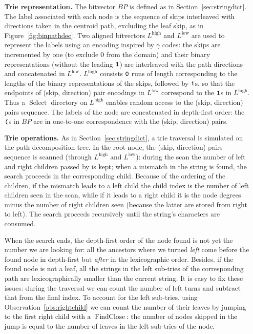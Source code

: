 \documentclass[a4paper,11pt]{article}
\newcommand{\ttlpar}[1]{\noindent\textbf{#1}}
\theoremstyle{nonumberplain}
\DeclareMathOperator{\Select}{Select}
\DeclareMathOperator{\FindClose}{FindClose}
\newcommand{\bit}[1]{\text{\bf\texttt{#1}}}
\newcommand{\bitzero}{\bit{0}}
\newcommand{\bitone}{\bit{1}}
\newcommand{\paropen}{\text{\bf\texttt{(}}}
\newcommand{\Lhigh}{L^\text{high}}
\newcommand{\Llow}{L^\text{low}}
\begin{document}
\ttlpar{Trie representation.} 
The bitvector $BP$ is defined as in Section~\ref{sec:stringdict}. The
label associated with each node is the sequence of skips interleaved
with directions taken in the centroid path, excluding the leaf skip,
as in Figure~\ref{fig:binpathdec}. Two aligned bitvectors $\Lhigh$ and $\Llow$
are used to represent the labels using an encoding inspired by
$\gamma$ codes: the skips are incremented by one (to exclude $0$ from
the domain) and their binary representations (without the leading $\bitone$) are interleaved with the
path directions and concatenated in $\Llow$. $\Lhigh$ consists 
$\bitzero$ runs of length corresponding to the 
lengths of the binary representations of the skips, followed by
$\bitone$s, so that the endpoints of (skip, direction) pair encodings in $\Llow$
correspond to the $\bitone$s in $\Lhigh$. Thus a $\Select$ directory on
$\Lhigh$ enables random access to the (skip, direction) pairs
sequence. The labels of the node are concatenated in depth-first
order: the $\paropen$s in $BP$ are in one-to-one correspondence
with the (skip, direction) pairs.

\ttlpar{Trie operations.} 
As in Section~\ref{sec:stringdict}, a trie traversal is simulated on
the path decomposition tree. In the root node, the (skip, direction)
pairs sequence is scanned (through $\Lhigh$ and $\Llow$): during the
scan the number of left and right children passed by is kept; when a
mismatch in the string is found, the search proceeds in the
corresponding child. Because of the ordering of the children, if the
mismatch leads to a left child the child index is the number of left
children seen in the scan, while if it leads to a right child it is
the node degrees minus the number of right children seen (because the
latter are stored from right to left). The search proceeds recursively
until the string's characters are consumed.

When the search ends, the depth-first order of the node found is not yet the
number we are looking for: all the ancestors where we turned
\emph{left} come before the found node in depth-first but \emph{after} in the
lexicographic order. Besides, if the found node is not a leaf, all the
strings in the left sub-tries of the corresponding path are
lexicographically smaller than the current string.
It is easy to fix these issues: during the traversal we can count the
number of left turns and subtract that from the final index. To
account for the left sub-tries, using Observation~\ref{obs:rightchild}
we can count the number of their leaves by jumping to the first right
child with a $\FindClose$: the number of nodes skipped in the jump is
equal to the number of leaves in the left sub-tries of the node.
\end{document}
